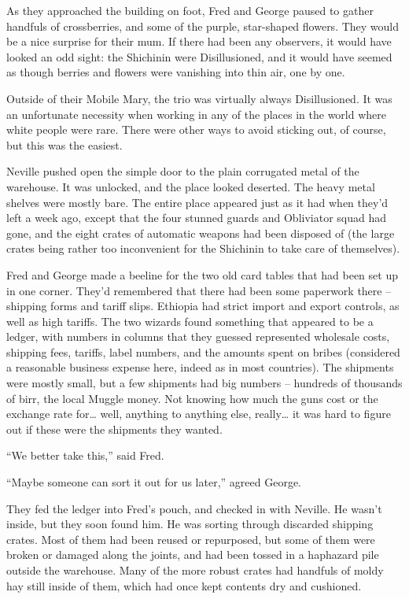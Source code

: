 As they approached the building on foot, Fred and George paused to
gather handfuls of crossberries, and some of the purple, star-shaped
flowers. They would be a nice surprise for their mum. If there had been
any observers, it would have looked an odd sight: the Shichinin were
Disillusioned, and it would have seemed as though berries and flowers
were vanishing into thin air, one by one.

Outside of their Mobile Mary, the trio was virtually always
Disillusioned. It was an unfortunate necessity when working in any of
the places in the world where white people were rare. There were other
ways to avoid sticking out, of course, but this was the easiest.

Neville pushed open the simple door to the plain corrugated metal of the
warehouse. It was unlocked, and the place looked deserted. The heavy
metal shelves were mostly bare. The entire place appeared just as it had
when they'd left a week ago, except that the four stunned guards and
Obliviator squad had gone, and the eight crates of automatic weapons had
been disposed of (the large crates being rather too inconvenient for the
Shichinin to take care of themselves).

Fred and George made a beeline for the two old card tables that had been
set up in one corner. They'd remembered that there had been some
paperwork there -- shipping forms and tariff slips. Ethiopia had strict
import and export controls, as well as high tariffs. The two wizards
found something that appeared to be a ledger, with numbers in columns
that they guessed represented wholesale costs, shipping fees, tariffs,
label numbers, and the amounts spent on bribes (considered a reasonable
business expense here, indeed as in most countries). The shipments were
mostly small, but a few shipments had big numbers -- hundreds of
thousands of birr, the local Muggle money. Not knowing how much the guns
cost or the exchange rate for\ldots{} well, anything to anything else,
really\ldots{} it was hard to figure out if these were the shipments
they wanted.

``We better take this,'' said Fred.

``Maybe someone can sort it out for us later,'' agreed George.

They fed the ledger into Fred's pouch, and checked in with Neville. He
wasn't inside, but they soon found him. He was sorting through discarded
shipping crates. Most of them had been reused or repurposed, but some of
them were broken or damaged along the joints, and had been tossed in a
haphazard pile outside the warehouse. Many of the more robust crates had
handfuls of moldy hay still inside of them, which had once kept contents
dry and cushioned.

